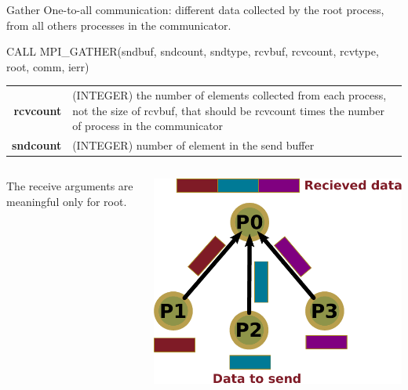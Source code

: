 \documentclass[aspectratio=43]{beamer}
\begin{document}
\begin{frame}[fragile]{Gather}
One-to-all communication: different data collected by the root process, from all others processes in the communicator.\\
\begin{Fortranlisting}[]{}
CALL MPI_GATHER(sndbuf, sndcount, sndtype,
                rcvbuf, rcvcount, rcvtype,
                root, comm, ierr)
\end{Fortranlisting}
\begin{black1block}{}
\begin{tabular}{rp{8cm}}
\textbf{rcvcount} & (INTEGER) the number of elements collected from each process, not the size of rcvbuf, that should be rcvcount times the number of process in the communicator\\
\textbf{sndcount} & (INTEGER) number of element in the send buffer\\
\end{tabular}
\end{black1block}
\begin{columns}
    \begin{column}{0.7\paperwidth}
        \hspace{1cm}The receive arguments are meaningful only for root.
    \end{column}
    \begin{column}{0.3\paperwidth}
    \includegraphics[scale=0.3]{03.MPI_Coll/gather.pdf}\\
    \end{column}
\end{columns}
\end{frame}
\end{document}
